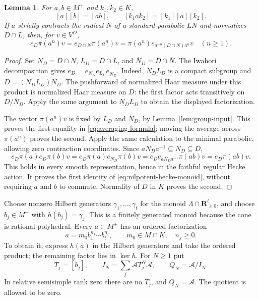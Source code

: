 \documentclass[10pt,letterpaper]{amsart}
\numberwithin{equation}{section}
\newtheorem{lemma}[theorem]{Lemma}
\theoremstyle{remark}
\begin{document}
\begin{lemma}\label{lem:positive-operators}
For $a,b\in M^+$ and $k_1,k_2\in K$,
\begin{equation}\label{eq:nilpotent-hecke-monoid}
 [a][b]=[ab],\qquad [k_1ak_2]=[k_1][a][k_2].
\end{equation}
If $a$ strictly contracts the radical $N$ of a standard parabolic $LN$
and normalizes $D\cap L$, then, for $v\in V^D$,
\begin{equation}\label{eq:averaging-formula}
 e_D\pi(a^n)v
 =e_{D\cap N}\pi(a^n)v
 =\pi(a^n)e_{a^{-n}(D\cap N)a^n}v\quad(n\ge1).
\end{equation}
\end{lemma}

\begin{proof}
Set $N_D=D\cap N$, $L_D=D\cap L$, and $\overline N_D=D\cap\overline N$.
The Iwahori decomposition gives
$e_D=e_{N_D}e_{L_D}e_{\overline N_D}$. Indeed, $N_DL_D$ is a compact
subgroup and $D=(N_DL_D)\overline N_D$. The pushforward of normalized Haar
measure under this product is normalized Haar measure on $D$: the first
factor acts transitively on $D/\overline N_D$. Apply the same argument to
$N_DL_D$ to obtain the displayed factorization.

The vector $\pi(a^n)v$ is fixed by $L_D$ and $\overline N_D$, by
Lemma~\ref{lem:group-input}. This proves the first equality in
\eqref{eq:averaging-formula}; moving the average across $\pi(a^n)$ proves
the second. Apply the same calculation to the minimal parabolic, allowing
zero contraction coordinates. Since $aN_Da^{-1}\subseteq N_D\subseteq D$,
\[
 e_D\pi(a)e_D\pi(b)v
 =e_D\pi(a)e_{N_D}\pi(b)v
 =e_De_{aN_Da^{-1}}\pi(ab)v
 =e_D\pi(ab)v.
\]
This holds in every smooth representation, hence in the faithful regular
Hecke action. It proves the first identity of
\eqref{eq:nilpotent-hecke-monoid}, without requiring $a$ and $b$ to commute.
Normality of $D$ in $K$ proves the second.
\end{proof}

Choose nonzero Hilbert generators $\gamma_1,\ldots,\gamma_t$ for the monoid
$\Lambda\cap\mathbf R_{\ge0}^\ell$, and choose $b_j\in M^+$ with
$h(b_j)=\gamma_j$. This is a finitely generated monoid because the cone is
rational polyhedral. Every $a\in M^+$ has an ordered factorization
\begin{equation}\label{eq:nilpotent-hecke-cartan}
 a=m_0b_1^{n_1}\cdots b_t^{n_t},\qquad m_0\in M\cap K,\quad n_j\ge0.
\end{equation}
To obtain it, express $h(a)$ in the Hilbert generators and take the ordered
product; the remaining factor lies in $\ker h$. For $N\ge1$ put
\begin{equation}\label{eq:quotient-definition}
 T_j=[b_j],\qquad I_N=\sum_j\mathcal A T_j^N\mathcal A,\qquad
 Q_N=\mathcal A/I_N.
\end{equation}
In relative semisimple rank zero there are no $T_j$, and $Q_N=\mathcal A$.
The quotient is allowed to be zero.
\end{document}
